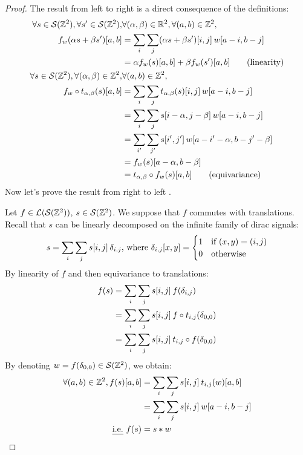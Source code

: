 \begin{proof}
The result from left to right is a direct consequence of the definitions:
\begin{align}
\forall s \in \cs(\bbz^2), \forall s' \in \cs(\bbz^2), & \forall (\alpha, \beta) \in \bbr^2,\forall (a,b) \in \bbz^2,\nonumber\\
 f_w(\alpha s + \beta s')[a,b] & = \displaystyle \sum_i \sum_j (\alpha s + \beta s')[i,j] \h{2} w[a-i, b-j]\nonumber\\
 & = \alpha f_w(s)[a,b] + \beta f_w(s')[a,b] \tag{linearity}\\
\forall s \in \cs(\bbz^2), \forall (\alpha, \beta) \in \bbz^2, & \forall (a,b) \in \bbz^2,\nonumber\\
f_w \circ t_{\alpha,\beta} (s)[a,b] & = \displaystyle \sum_i \sum_j t_{\alpha,\beta}(s)[i,j] \h{2} w[a-i, b-j]\nonumber\\
 & = \displaystyle \sum_i \sum_j s[i - \alpha,j - \beta] \h{2} w[a-i, b-j]\nonumber\\
 & = \displaystyle \sum_{i'} \sum_{j'} s[i',j'] \h{2} w[a - i' - \alpha, b - j'- \beta]\label{eq:bij}\\
 & = f_w (s)[a - \alpha,b - \beta]\nonumber\\
 & = t_{\alpha,\beta} \circ f_w (s)[a,b] \tag{equivariance}
\end{align}
Now let's prove the result from right to left .

Let $f \in \cl(\cs(\bbz^2))$, $s \in \cs(\bbz^2)$. We suppose that $f$ commutes with translations. Recall that $s$ can be linearly decomposed on the infinite family of dirac signals:
\begin{gather*}
s = \displaystyle \sum_i \sum_j s[i,j] \h{2} \delta_{i,j} \text{, where }
\delta_{i,j}[x,y] = \begin{cases} 1 & \text{if } (x,y) = (i,j)\\ 0 & \text{otherwise} \end{cases}
\end{gather*}
By linearity of $f$ and then equivariance to translations:
\begin{align*}
f(s) & = \displaystyle \sum_i \sum_j s[i,j] \h{2} f(\delta_{i,j})\\
 & = \displaystyle \sum_i \sum_j s[i,j] \h{2} f \circ t_{i,j} (\delta_{0,0})\\
 & = \displaystyle \sum_i \sum_j s[i,j] \h{2} t_{i,j} \circ f (\delta_{0,0})
\end{align*}
By denoting $w = f (\delta_{0,0}) \in \cs(\bbz^2)$, we obtain:
\begin{align}
\forall (a,b) \in \bbz^2, f(s)[a,b] & = \displaystyle \sum_i \sum_j s[i,j] \h{2} t_{i,j}(w)[a,b] \label{eq:conv}\\
 & = \displaystyle \sum_i \sum_j s[i,j] \h{2} w[a-i, b-j] \nonumber\\
\text{\ie } f(s) & = s \ast w \nonumber
\end{align}
\end{proof}


